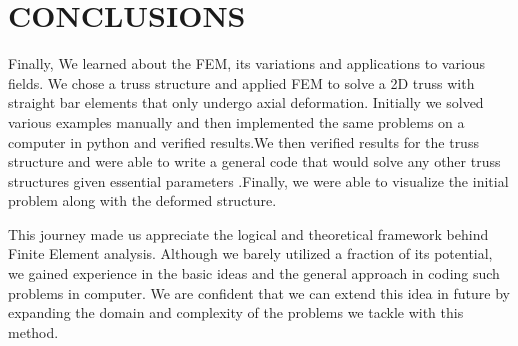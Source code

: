 
\chapter{CONCLUSIONS}

	Finally, We learned about the FEM, its variations and applications to various fields. We chose a truss structure and applied FEM to solve a 2D truss with straight bar elements that only undergo axial deformation. Initially we solved various examples manually and then implemented the same problems on a computer in python and verified results.We then verified results for the truss structure and were able to write a general code that would solve any other truss structures given essential parameters .Finally, we were able to visualize the initial problem along with the deformed structure. 
	
	This journey made us appreciate the logical and theoretical framework behind Finite Element analysis. Although we barely utilized a fraction of its potential, we gained experience in the basic ideas and the general approach in coding such problems in computer. We are confident that we can extend this idea in future by expanding the domain and complexity of the problems we tackle with this method.
 



